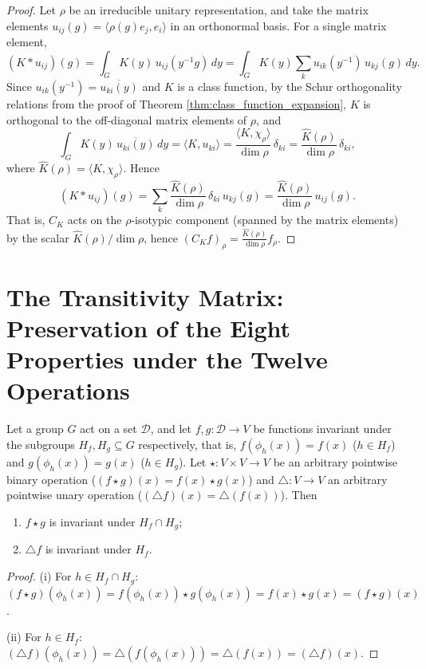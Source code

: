 \begin{proof}
Let $\rho$ be an irreducible unitary representation, and take the matrix elements $u_{ij}(g)=\langle\rho(g)e_j,e_i\rangle$ in an orthonormal basis. For a single matrix element,
\[
(K*u_{ij})(g)=\int_G K(y)\,u_{ij}(y^{-1}g)\,dy=\int_G K(y)\sum_k u_{ik}(y^{-1})\,u_{kj}(g)\,dy.
\]
Since $u_{ik}(y^{-1})=\overline{u_{ki}(y)}$ and $K$ is a class function, by the Schur orthogonality relations from the proof of Theorem \ref{thm:class_function_expansion}, $K$ is orthogonal to the off-diagonal matrix elements of $\rho$, and
\[
\int_G K(y)\,\overline{u_{ki}(y)}\,dy=\langle K,u_{ki}\rangle=\frac{\langle K,\chi_\rho\rangle}{\dim\rho}\,\delta_{ki}=\frac{\hat K(\rho)}{\dim\rho}\,\delta_{ki},
\]
where $\hat K(\rho)=\langle K,\chi_\rho\rangle$. Hence
\[
(K*u_{ij})(g)=\sum_k\frac{\hat K(\rho)}{\dim\rho}\,\delta_{ki}\,u_{kj}(g)=\frac{\hat K(\rho)}{\dim\rho}\,u_{ij}(g).
\]
That is, $C_K$ acts on the $\rho$-isotypic component (spanned by the matrix elements) by the scalar $\hat K(\rho)/\dim\rho$, hence $(C_K f)_\rho=\frac{\hat K(\rho)}{\dim\rho}f_\rho$.
\end{proof}

\section{\texorpdfstring{The Transitivity Matrix: Preservation of the Eight Properties under the Twelve Operations}{The Transitivity Matrix}}

\begin{lemma}\label{ch8_pointwise_invariance}
Let a group $G$ act on a set $\mathcal{D}$, and let $f,g:\mathcal{D}\to V$ be functions invariant under the subgroups $H_f,H_g\subseteq G$ respectively, that is, $f(\phi_h(x))=f(x)$ ($h\in H_f$) and $g(\phi_h(x))=g(x)$ ($h\in H_g$). Let $\star:V\times V\to V$ be an arbitrary pointwise binary operation ($(f\star g)(x)=f(x)\star g(x)$) and $\triangle:V\to V$ an arbitrary pointwise unary operation ($(\triangle f)(x)=\triangle(f(x))$). Then
\begin{enumerate}[label=(\roman*)]
    \item $f\star g$ is invariant under $H_f\cap H_g$;
    \item $\triangle f$ is invariant under $H_f$.
\end{enumerate}
\end{lemma}

\begin{proof}
(i) For $h\in H_f\cap H_g$: $(f\star g)(\phi_h(x))=f(\phi_h(x))\star g(\phi_h(x))=f(x)\star g(x)=(f\star g)(x)$.

(ii) For $h\in H_f$: $(\triangle f)(\phi_h(x))=\triangle(f(\phi_h(x)))=\triangle(f(x))=(\triangle f)(x)$.
\end{proof}

